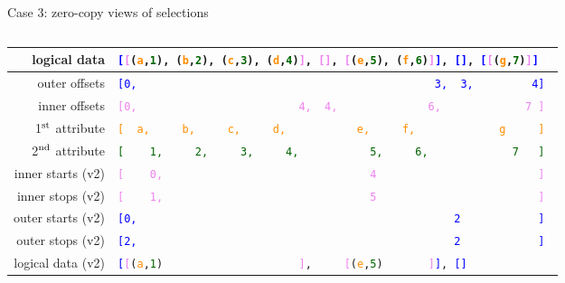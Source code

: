 \documentclass[aspectratio=169]{beamer}
\begin{document}
\begin{frame}{Case 3: zero-copy views of selections}
\begin{columns}
\begin{tabular}{r l}
\small logical data & {\tt\scriptsize \textcolor{blue}{[}\textcolor{violet}{[}(\textcolor{darkorange}{a},\textcolor{darkgreen}{1}), (\textcolor{darkorange}{b},\textcolor{darkgreen}{2}), (\textcolor{darkorange}{c},\textcolor{darkgreen}{3}), (\textcolor{darkorange}{d},\textcolor{darkgreen}{4})\textcolor{violet}{]}, \textcolor{violet}{[]}, \textcolor{violet}{[}(\textcolor{darkorange}{e},\textcolor{darkgreen}{5}), (\textcolor{darkorange}{f},\textcolor{darkgreen}{6})\textcolor{violet}{]}\textcolor{blue}{]}, \textcolor{blue}{[]}, \textcolor{blue}{[}\textcolor{violet}{[}(\textcolor{darkorange}{g},\textcolor{darkgreen}{7})\textcolor{violet}{]}\textcolor{blue}{]}\ \textcolor{white}{]}} \\\hline
\small outer offsets & {\tt\scriptsize \textcolor{blue}{[0,\ \ \ \ \ \ \ \ \ \ \ \ \ \ \ \ \ \ \ \ \ \ \ \ \ \ \ \ \ \ \ \ \ \ \ \ \ \ \ \ \ \ \ \ \ \ 3,\ \ 3,\ \ \ \ \ \ \ \ \ 4]}} \\
\small inner offsets & {\tt\scriptsize \textcolor{violet}{[0,\ \ \ \ \ \ \ \ \ \ \ \ \ \ \ \ \ \ \ \ \ \ \ \ \ 4,\ \ 4,\ \ \ \ \ \ \ \ \ \ \ \ \ \ 6,\ \ \ \ \ \ \ \ \ \ \ \ \ 7\ ]}} \\
\small 1$^{\mbox{\scriptsize st}}$ attribute & {\tt\scriptsize \textcolor{darkorange}{[\ \ a,\ \ \ \ \ b,\ \ \ \ \ c,\ \ \ \ \ d,\ \ \ \ \ \ \ \ \ \ \ e,\ \ \ \ \ f,\ \ \ \ \ \ \ \ \ \ \ \ \ g\ \ \ \ \ ]}} \\
\small 2$^{\mbox{\scriptsize nd}}$ attribute & {\tt\scriptsize \textcolor{darkgreen}{[\ \ \ \ 1,\ \ \ \ \ 2,\ \ \ \ \ 3,\ \ \ \ \ 4,\ \ \ \ \ \ \ \ \ \ \ 5,\ \ \ \ \ 6,\ \ \ \ \ \ \ \ \ \ \ \ \ 7\ \ \ ]}} \\
\small inner starts (v2) & {\tt\scriptsize \textcolor{violet}{[\ \ \ \ 0,\ \ \ \ \ \ \ \ \ \ \ \ \ \ \ \ \ \ \ \ \ \ \ \ \ \ \ \ \ \ \ \ 4\ \ \ \ \ \ \ \ \ \ \ \ \ \ \ \ \ \ \ \ \ \ \ \ \ ]}} \\
\small inner stops (v2) & {\tt\scriptsize \textcolor{violet}{[\ \ \ \ 1,\ \ \ \ \ \ \ \ \ \ \ \ \ \ \ \ \ \ \ \ \ \ \ \ \ \ \ \ \ \ \ \ 5\ \ \ \ \ \ \ \ \ \ \ \ \ \ \ \ \ \ \ \ \ \ \ \ \ ]}} \\
\small outer starts (v2) & {\tt\scriptsize \textcolor{blue}{[0,\ \ \ \ \ \ \ \ \ \ \ \ \ \ \ \ \ \ \ \ \ \ \ \ \ \ \ \ \ \ \ \ \ \ \ \ \ \ \ \ \ \ \ \ \ \ \ \ \ 2\ \ \ \ \ \ \ \ \ \ \ \ ]}} \\
\small outer stops (v2) & {\tt\scriptsize \textcolor{blue}{[2,\ \ \ \ \ \ \ \ \ \ \ \ \ \ \ \ \ \ \ \ \ \ \ \ \ \ \ \ \ \ \ \ \ \ \ \ \ \ \ \ \ \ \ \ \ \ \ \ \ 2\ \ \ \ \ \ \ \ \ \ \ \ ]}} \\\hline
\small logical data (v2) & {\tt\scriptsize \textcolor{blue}{[}\textcolor{violet}{[}(\textcolor{darkorange}{a},\textcolor{darkgreen}{1})\ \ \ \ \ \ \ \ \ \ \ \ \ \ \ \ \ \ \ \ \ \textcolor{violet}{]}, \ \ \ \ \textcolor{violet}{[}(\textcolor{darkorange}{e},\textcolor{darkgreen}{5})\ \ \ \ \ \ \ \textcolor{violet}{]}\textcolor{blue}{]}, \textcolor{blue}{[]}} \\
\end{tabular}
\end{columns}


\end{frame}
\end{document}

